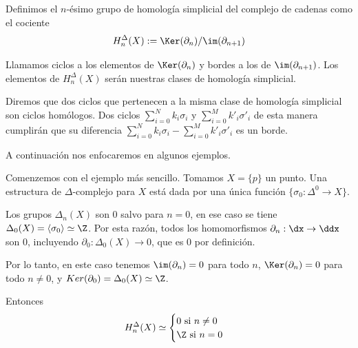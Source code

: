 \begin{df}

Definimos el $n$-ésimo grupo de homología simplicial del complejo de cadenas como el cociente $$H_n^{\Delta}(X):=\Ker(\partial_n)/\im(\partial_{n+1})$$\br

Llamamos ciclos a los elementos de $\Ker(\partial_n)$ y bordes a los de $\im(\partial_{n+1})$. Los elementos de $H_n^{\Delta}(X)$ serán nuestras clases de homología simplicial.\br 

Diremos que dos ciclos que pertenecen a la misma clase de homología simplicial son ciclos homólogos. Dos ciclos $\sum_{i=0}^N k_i\sigma_i$ y $\sum_{i=0}^M k'_i\sigma'_i$ de esta manera cumplirán que su diferencia $\sum_{i=0}^N k_i\sigma_i - \sum_{i=0}^M k'_i\sigma'_i$ es un borde.\br

\end{df}


A continuación nos enfocaremos en algunos ejemplos.

\begin{ex}
    Comenzemos con el ejemplo más sencillo. Tomamos $X = \{p\}$ un punto. Una estructura de $\Delta$-complejo para $X$ está dada por una única función $\{\sigma_0:\Delta^0\to X\}$. \br
    
    Los grupos $\Delta_n(X)$ son $0$ salvo para $n=0$, en ese caso se tiene $\Delta_0(X)=\langle\sigma_0\rangle\simeq\Z$. Por esta razón, todos los homomorfismos $\partial_n:\dx\to\ddx$ son $0$, incluyendo $\partial_0:\Delta_0(X)\to 0$, que es $0$ por definición.\br

    Por lo tanto, en este caso tenemos $\im(\partial_n)=0$ para todo $n$, $\Ker(\partial_n)=0$ para todo $n\neq 0$, y $Ker(\partial_0)=\Delta_0(X)\simeq\Z$.\br

    Entonces $$H^{\Delta}_n(X)\simeq
    \begin{cases}
    0\text{ si } n\neq 0 \\
    \Z\text{ si } n=0
    \end{cases}$$
\end{ex}\br

